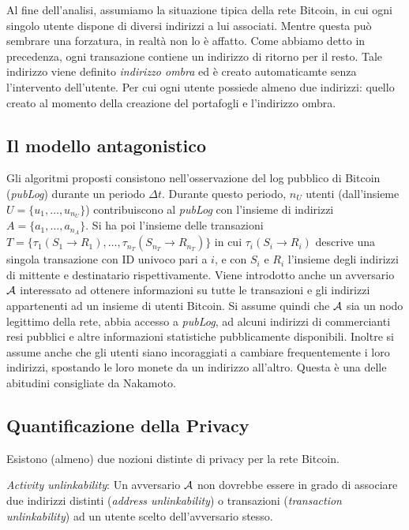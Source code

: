Al fine dell'analisi, assumiamo la situazione tipica della rete Bitcoin, in cui ogni singolo utente dispone di diversi indirizzi a lui associati. Mentre questa può sembrare una forzatura, in realtà non lo è affatto. Come abbiamo detto in precedenza, ogni transazione contiene un indirizzo di ritorno per il resto. Tale indirizzo viene definito \emph{indirizzo ombra} ed è creato automaticamte senza l'intervento dell'utente. Per cui ogni utente possiede almeno due indirizzi: quello creato al momento della creazione del portafogli e l'indirizzo ombra.

\subsection{Il modello antagonistico}\label{il-modello-antagonistico}

Gli algoritmi proposti consistono nell'osservazione del log pubblico di Bitcoin (\emph{pubLog}) durante un periodo $\Delta t$. Durante questo periodo, $n_U $ utenti (dall'insieme $U = \{u_1, \ldots, u_{n_U}\}$) contribuiscono al \emph{pubLog} con l'insieme di indirizzi $A = \{a_1, \ldots, a_{n_A}\}$. Si ha poi l'insieme delle transazioni $T = \{ \tau_1 (S_1 \rightarrow R_1), \ldots , \tau_{n_T}(S_{n_T} \rightarrow R_{n_T}) \} $ in cui $\tau_i (S_i \rightarrow R_i)$ descrive una singola transazione con ID univoco pari a $i$, e con $S_i$ e $R_i$ l'insieme degli indirizzi di mittente e destinatario rispettivamente. Viene introdotto anche un avversario $\mathcal{A}$ interessato ad ottenere informazioni su tutte le transazioni e gli indirizzi appartenenti ad un insieme di utenti Bitcoin. Si assume quindi che $\mathcal{A}$ sia un nodo legittimo della rete, abbia accesso a \emph{pubLog}, ad alcuni indirizzi di commercianti resi pubblici e altre informazioni statistiche pubblicamente disponibili. Inoltre si assume anche che gli utenti siano incoraggiati a cambiare frequentemente i loro indirizzi, spostando le loro monete da un indirizzo all'altro. Questa è una delle abitudini consigliate da Nakamoto.

\subsection{Quantificazione della Privacy}\label{quantificazione-della-privacy}

Esistono (almeno) due nozioni distinte di privacy per la rete Bitcoin.

\emph{Activity unlinkability}: Un avversario $\mathcal{A}$ non dovrebbe essere in grado di associare due indirizzi distinti (\emph{address unlinkability}) o transazioni (\emph{transaction unlinkability}) ad un utente scelto dell'avversario stesso.

